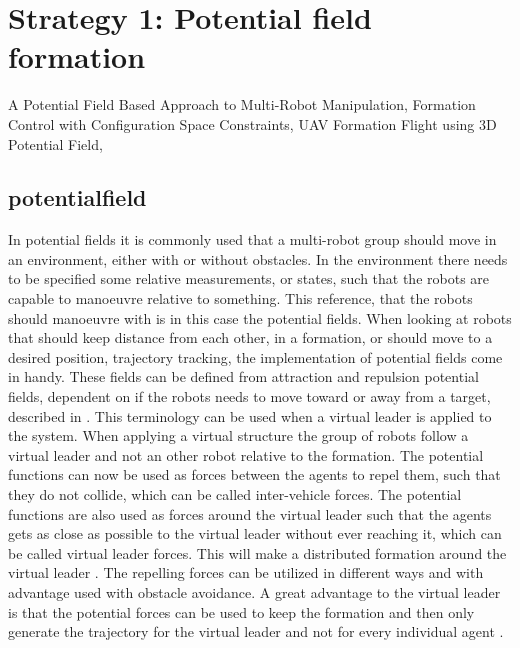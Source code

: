 \section{Strategy 1: Potential field formation}
A Potential Field Based Approach to Multi-Robot Manipulation,
Formation Control with Configuration Space Constraints,
UAV Formation Flight using 3D Potential Field, 

\subsection{potentialfield}
In potential fields it is commonly used that a multi-robot group should move in an environment, either with or without obstacles. In the environment there needs to be specified some relative measurements, or states, such that the robots are capable to manoeuvre relative to something. This reference, that the robots should manoeuvre with is in this case the potential fields. When looking at robots that should keep distance from each other, in a formation, or should move to a desired position, trajectory tracking, the implementation of potential fields come in handy. These fields can be defined from attraction and repulsion potential fields, dependent on if the robots needs to move toward or away from a target, described in \citep{PS:02}. This terminology can be used when a virtual leader is applied to the system. When applying a virtual structure the group of robots follow a virtual leader and not an other robot relative to the formation. The potential functions can now be used as forces between the agents to repel them, such that they do not collide, which can be called inter-vehicle forces. The potential functions are also used as forces around the virtual leader such that the agents gets as close as possible to the virtual leader without ever reaching it, which can be called virtual leader forces. This will make a distributed formation around the virtual leader \citep{1655803}. The repelling forces can be utilized in different ways and with advantage used with obstacle avoidance. A great advantage to the virtual leader is that the potential forces can be used to keep the formation and then only generate the trajectory for the virtual leader and not for every individual agent \citep{1655803}.

